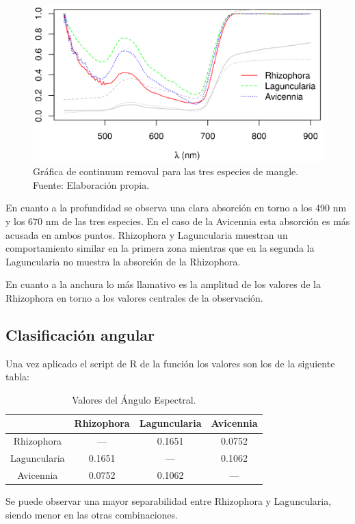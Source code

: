 \begin{figure}
	\centering
	\includegraphics[width=0.8\linewidth]{./Imagenes/ContinuumR2.eps}
	\caption[Gráfica de Continuum Removal]{Gráfica de continuum removal para las tres especies de mangle. Fuente: Elaboración propia.}
	\label{fig:GraficaCR}
\end{figure}

En cuanto a la profundidad se observa una clara absorción en torno a los 490 nm y los 670 nm de las tres especies. En el caso de la Avicennia esta absorción es más acusada en ambos puntos. Rhizophora y Laguncularia muestran un comportamiento similar en la primera zona mientras que en la segunda la Laguncularia no muestra la absorción de la Rhizophora.\Sep

En cuanto a la anchura lo más llamativo es la amplitud de los valores de la Rhizophora en torno a los valores centrales de la observación.

\subsection{Clasificación angular}
Una vez aplicado el script de R de la función los valores son los de la siguiente tabla:

\begin{table}[ht]
	\centering
	\caption[Valores de Ángulo Espectral]{Valores del Ángulo Espectral.}
	\begin{tabular}{|c|c|c|c|}
	\hline
	& Rhizophora & Laguncularia & Avicennia \\
	\hline
	Rhizophora & --- & 0.1651 & 0.0752 \\
	\hline
	Laguncularia & 0.1651 & --- & 0.1062 \\
	\hline
	Avicennia & 0.0752 & 0.1062 & --- \\
	\hline
	\end{tabular}
\end{table}

Se puede observar una mayor separabilidad entre Rhizophora y Laguncularia, siendo menor en las otras combinaciones.
